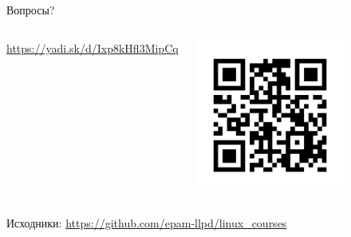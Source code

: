 \begin{frame}[fragile]{Вопросы?}
    \setcounter{tocdepth}{2}
    \tableofcontents

    \bigskip

    \hrulefill
    \begin{columns}
            \url{https://yadi.sk/d/Ixp8kHfl3MipCq}
        \begin{center}
            \includegraphics[width=0.7\textwidth]{url-qr-2017}
        \end{center}
    \end{columns}

    Исходники: \url{https://github.com/epam-llpd/linux_courses}

\end{frame}
